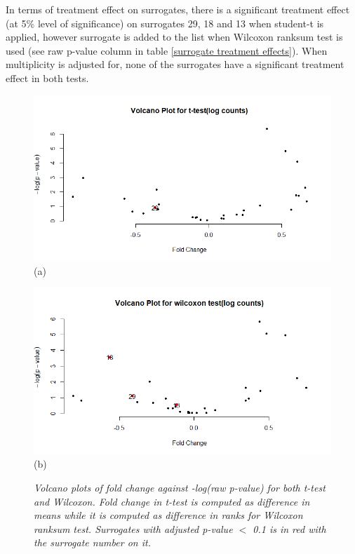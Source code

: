 \documentclass[a4paper,12pt]{article}
\begin{document}
	In terms of treatment effect on surrogates, there is a significant treatment effect (at 5\% level of significance) on surrogates 29, 18 and 13 when student-t is applied, however surrogate is added to the list when Wilcoxon ranksum test is used (see raw p-value column in table \ref{surrogate treatment effects}). When multiplicity is adjusted for, none of the surrogates have a significant treatment effect in both tests.
	
	\begin{figure}[H]
		\begin{minipage}{0.5\textwidth}
			\includegraphics[scale=0.45]{t-testvolcano_plot_logcounts.png}\\(a)
		\end{minipage}
		\begin{minipage}{0.5\textwidth}
			\includegraphics[scale=0.45]{wilcox_volcano_plot_logcounts.png}\\(b)
		\end{minipage}
		\caption{\small \textit{Volcano plots of fold change against -log(raw p-value) for both t-test and Wilcoxon. Fold change in t-test is computed as difference in means while it is computed as difference in ranks for Wilcoxon ranksum test. Surrogates with adjusted p-value $<$ 0.1 is in red with the surrogate number on it.}}\label{volcanoplots}
	\end{figure}
\end{document}
